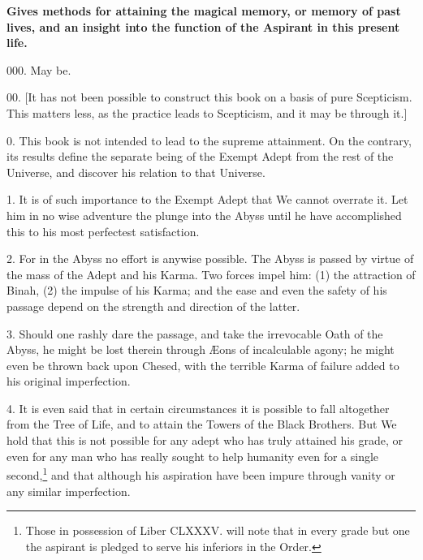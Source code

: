 \textbf{Gives methods for attaining the magical memory, or memory of past lives, and an insight into the function of the Aspirant in this present life.}

000. May be.

00. [It has not been possible to construct this book on a basis of pure Scepticism. This matters less, as the practice leads to Scepticism, and it may be through it.]

0. This book is not intended to lead to the supreme attainment. On the contrary, its results define the separate being of the Exempt Adept from the rest of the Universe, and discover his relation to that Universe.

1. It is of such importance to the Exempt Adept that We cannot overrate it. Let him in no wise adventure the plunge into the Abyss until he have accomplished this to his most perfectest satisfaction.

2. For in the Abyss no effort is anywise possible. The Abyss is passed by virtue of the mass of the Adept and his Karma. Two forces impel him: (1) the attraction of Binah, (2) the impulse of his Karma; and the ease and even the safety of his passage depend on the strength and direction of the latter.

3. Should one rashly dare the passage, and take the irrevocable Oath of the Abyss, he might be lost therein through \AE{}ons of incalculable agony; he might even be thrown back upon Chesed, with the terrible Karma of failure added to his original imperfection.

4. It is even said that in certain circumstances it is possible to fall altogether from the Tree of Life, and to attain the Towers of the Black Brothers. But We hold that this is not possible for any adept who has truly attained his grade, or even for any man who has really sought to help humanity even for a single second,\footnote{Those in possession of Liber CLXXXV. will note that in every grade but one the aspirant is pledged to serve his inferiors in the Order.} and that although his aspiration have been impure through vanity or any similar imperfection.


